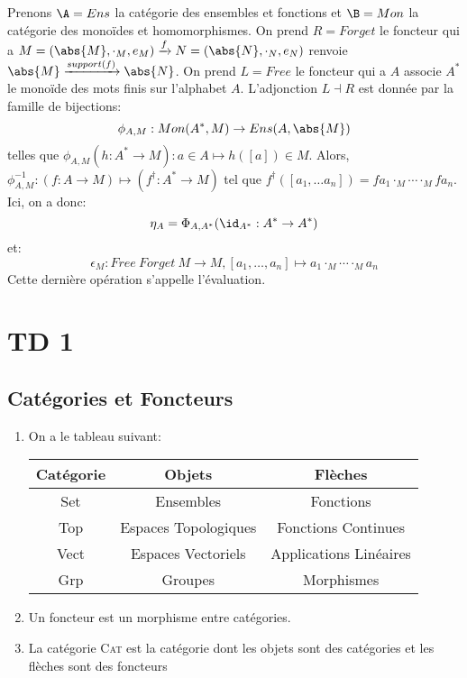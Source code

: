 \documentclass[math, info]{cours}
\begin{document}
\begin{exemple}
	Prenons $\A = Ens$ la catégorie des ensembles et fonctions et $\B = Mon$ la catégorie des monoïdes et homomorphismes.
	On prend $R = Forget$ le foncteur qui a $M = (\abs{M}, \cdot_{M}, e_{M}) \xrightarrow{f} N = (\abs{N}, \cdot_{N}, e_{N})$ renvoie $\abs{M} \xrightarrow{support(f)} \abs{N}$.
	On prend $L = Free$ le foncteur qui a $A$ associe $A^{*}$ le monoïde des mots finis sur l'alphabet $A$.
	L'adjonction $L \dashv R$ est donnée par la famille de bijections:
	\begin{equation*}
		\phi_{A, M}: Mon(A^{*}, M) \to Ens(A, \abs{M})
	\end{equation*}
	telles que
	$\phi_{A, M}(h : A^{*} \to M): a\in A \mapsto h([a]) \in M$.
	Alors, $\phi_{A, M}^{-1}: (f: A\to M) \mapsto (f^{\dag}: A^{*} \to M)$ tel que $f^{\dag}([a_{1}, \ldots a_{n}]) = fa_{1}\cdot_{M} \cdots \cdot_{M}fa_{n}$.
	Ici, on a donc:
	\begin{equation*}
		\eta_{A} = \Phi_{A, A^{*}}(\id_{A^{*}}: A^{*} \to A^{*})
	\end{equation*}
	et:
	\begin{equation*}
		\epsilon_{M}: Free\ Forget\ M \to M, [a_{1}, \ldots, a_{n}] \mapsto a_{1}\cdot_{M} \cdots \cdot_{M}a_{n}
	\end{equation*}
	Cette dernière opération s'appelle l'évaluation.
\end{exemple}

\section{TD 1}
\subsection{Catégories et Foncteurs}
\begin{enumerate}
	\item On a le tableau suivant:
	      \begin{tabular}{>{\sc}ccc}
		      \bf Catégorie & \bf Objets           & \bf Flèches            \\
		      \midrule
		      Set           & Ensembles            & Fonctions              \\
		      Top           & Espaces Topologiques & Fonctions Continues    \\
		      Vect          & Espaces Vectoriels   & Applications Linéaires \\
		      Grp           & Groupes              & Morphismes
	      \end{tabular}
	\item Un foncteur est un morphisme entre catégories.
	\item La catégorie \textsc{Cat} est la catégorie dont les objets sont des catégories et les flèches sont des foncteurs
\end{enumerate}
\end{document}
